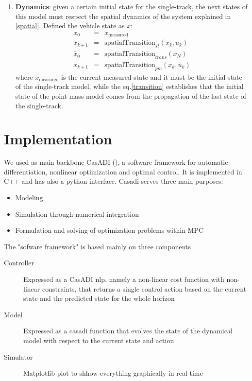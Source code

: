 \documentclass[a4paper, onecolumn, 12pt]{article}
\begin{document}
\begin{enumerate}
    \item \textbf{Dynamics}: given a certain initial state for the single-track, the next states of this model must respect the
    spatial dynamics of the system explained in \ref{spatial}. Defined the vehicle state as $x$:
    \begin{eqnarray}
        x_0 &=& x_{\text{measured}} \\
        x_{k+1} &=& \text{spatialTransition}_{st}(x_k, u_k) \\
        \bar{x}_0 &=& \text{spatialTransition}_{trans}(x_N) \label{transition}\\
        \bar{x}_{k+1} &=& \text{spatialTransition}_{pm}(\bar{x}_k, \bar{u}_k)
    \end{eqnarray}
    where $x_{\text{measured}}$ is the current measured state and it must be the initial state of the single-track model,
    while the eq.\ref{transition} establishes that the initial state of the point-mass model comes from the propagation of 
    the last state of the single-track.
\end{enumerate}


\section{Implementation}
We used as main backbone CasADI (\cite{casadi}), a software framework for automatic
differentiation, nonlinear optimization and optimal control. It is implemented
in C++ and has also a python interface. Casadi serves three main purposes:
\begin{itemize}
    \item Modeling
    \item Simulation through numerical integration
    \item Formulation and solving of optimization problems within MPC
\end{itemize}
The "sofware framework" is based mainly on three components
\begin{description}
    \item[Controller] Expressed as a CasADI nlp, namely a non-linear cost
    function with non-linear constraints, that returns a single control action
    based on the current state and the predicted state for the whole horizon
    \item[Model] Expressed as a casadi function that evolves the
    state of the dynamical model with respect to the current state and action
    \item[Simulator] Matplotlib plot to shhow everything graphically in real-time
\end{description}
\end{document}
